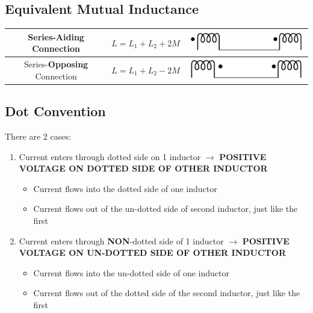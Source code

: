 \documentclass[10pt,letterpaper,final,twoside,notitlepage]{article}
\begin{document}
	\subsection*{Equivalent Mutual Inductance}
		\begin{table}[h!] %
			\centering
			\renewcommand{\arraystretch}{2.25}
			\begin{tabular}{|c|c|c|}
			\hline
			Series-\textbf{Aiding} Connection & $L=L_{1}+L_{2}+2M$ & \includegraphics[scale=0.35]{Mutual_Inductors_Series_Dots_Aiding.png} \\ \hline
			Series-\textbf{Opposing} Connection & $L=L_{1}+L_{2}-2M$ & \includegraphics[scale=0.35]{Mutual_Inductors_Series_Dots_Opposing.png} \\ \hline
			\end{tabular}
		\end{table}

	\subsection*{Dot Convention} \label{subsec:Dot Convention}
		There are 2 cases:
		\begin{enumerate}
			\item Current enters through dotted side on 1 inductor $\longrightarrow$ \textbf{POSITIVE VOLTAGE ON DOTTED SIDE OF OTHER INDUCTOR}
				\begin{itemize}[noitemsep, nolistsep]
					\item Current flows into the dotted side of one inductor
					\item Current flows out of the un-dotted side of second inductor, just like the first
				\end{itemize}
			\item Current enters through \textbf{NON}-dotted side of 1 inductor $\longrightarrow$ \textbf{POSITIVE VOLTAGE ON UN-DOTTED SIDE OF OTHER INDUCTOR}
				\begin{itemize}[noitemsep, nolistsep]
					\item Current flows into the un-dotted side of one inductor
					\item Current flows out of the dotted side of the second inductor, just like the first
				\end{itemize}
		\end{enumerate}
	
\end{document}

